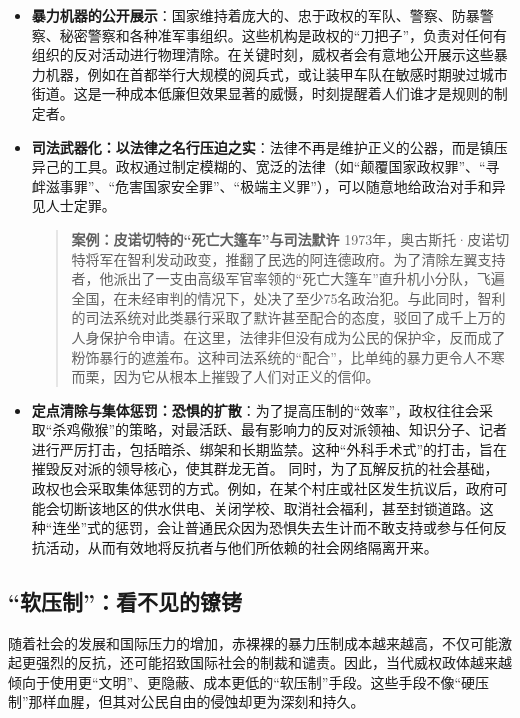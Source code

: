\begin{itemize}
    \item \textbf{暴力机器的公开展示}：国家维持着庞大的、忠于政权的军队、警察、防暴警察、秘密警察和各种准军事组织。这些机构是政权的“刀把子”，负责对任何有组织的反对活动进行物理清除。在关键时刻，威权者会有意地公开展示这些暴力机器，例如在首都举行大规模的阅兵式，或让装甲车队在敏感时期驶过城市街道。这是一种成本低廉但效果显著的威慑，时刻提醒着人们谁才是规则的制定者。
    \item \textbf{司法武器化：以法律之名行压迫之实}：法律不再是维护正义的公器，而是镇压异己的工具。政权通过制定模糊的、宽泛的法律（如“颠覆国家政权罪”、“寻衅滋事罪”、“危害国家安全罪”、“极端主义罪”），可以随意地给政治对手和异见人士定罪。
    \begin{quote}
    \textbf{案例：皮诺切特的“死亡大篷车”与司法默许}
    1973年，奥古斯托·皮诺切特将军在智利发动政变，推翻了民选的阿连德政府。为了清除左翼支持者，他派出了一支由高级军官率领的“死亡大篷车”直升机小分队，飞遍全国，在未经审判的情况下，处决了至少75名政治犯。与此同时，智利的司法系统对此类暴行采取了默许甚至配合的态度，驳回了成千上万的人身保护令申请。在这里，法律非但没有成为公民的保护伞，反而成了粉饰暴行的遮羞布。这种司法系统的“配合”，比单纯的暴力更令人不寒而栗，因为它从根本上摧毁了人们对正义的信仰。
    \end{quote}
    \item \textbf{定点清除与集体惩罚：恐惧的扩散}：为了提高压制的“效率”，政权往往会采取“杀鸡儆猴”的策略，对最活跃、最有影响力的反对派领袖、知识分子、记者进行严厉打击，包括暗杀、绑架和长期监禁。这种“外科手术式”的打击，旨在摧毁反对派的领导核心，使其群龙无首。
    同时，为了瓦解反抗的社会基础，政权也会采取集体惩罚的方式。例如，在某个村庄或社区发生抗议后，政府可能会切断该地区的供水供电、关闭学校、取消社会福利，甚至封锁道路。这种“连坐”式的惩罚，会让普通民众因为恐惧失去生计而不敢支持或参与任何反抗活动，从而有效地将反抗者与他们所依赖的社会网络隔离开来。
\end{itemize}

\subsection{“软压制”：看不见的镣铐}

随着社会的发展和国际压力的增加，赤裸裸的暴力压制成本越来越高，不仅可能激起更强烈的反抗，还可能招致国际社会的制裁和谴责。因此，当代威权政体越来越倾向于使用更“文明”、更隐蔽、成本更低的“软压制”手段。这些手段不像“硬压制”那样血腥，但其对公民自由的侵蚀却更为深刻和持久。

